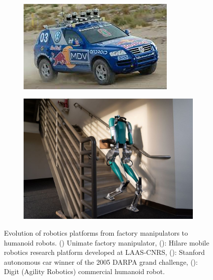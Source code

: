 \begin{figure}[h]
    \begin{subfigure}{0.49\textwidth}
        \includegraphics[width=\textwidth]{figures/darpa_car_stanford.jpeg}
        \caption{}
        \label{fig:darpa_stanford}
    \end{subfigure}%
    \hspace{0.5cm}
    \begin{subfigure}{0.41\textwidth}
        \includegraphics[width=\textwidth]{figures/digit.jpg}
        \caption{}
        \label{fig:digit}
    \end{subfigure}%
    \caption{Evolution of robotics platforms from factory manipulators to humanoid robots. () Unimate factory manipulator, 
    (): Hilare mobile robotics research platform developed at LAAS-CNRS, (): Stanford autonomous car winner of the 2005 DARPA grand challenge, 
    (): Digit (Agility Robotics) commercial humanoid robot.}

\end{figure}

